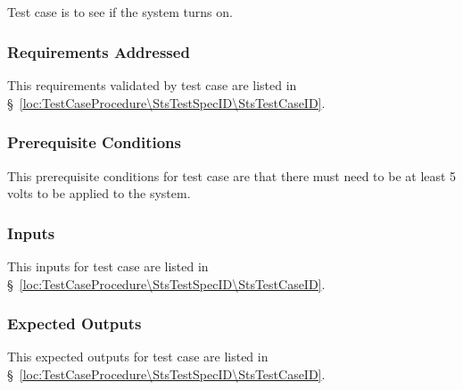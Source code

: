 
\subsection{\StsTestCaseID}
\label{loc:Test\StsTestCaseID}


Test \StsTestSpecID{} case \StsTestCaseID{} is to see if the system turns on.

\subsubsection{Requirements Addressed}
\label{loc:TestCaseRequirementsAddressed\StsTestSpecID\StsTestCaseID}


This requirements validated by test \StsTestSpecID{} case \StsTestCaseID{} are listed in \S~\ref{loc:TestCaseProcedure\StsTestSpecID\StsTestCaseID}.

\subsubsection{Prerequisite Conditions}
\label{loc:TestCasePrerequisiteConditions\StsTestSpecID\StsTestCaseID}


This prerequisite conditions for test \StsTestSpecID{} case \StsTestCaseID{} are that there must need to be at least 5 volts to be applied to the system.

\subsubsection{Inputs}
\label{loc:TestCaseInputs\StsTestSpecID\StsTestCaseID}


This inputs for test \StsTestSpecID{} case \StsTestCaseID{} are listed in \S~\ref{loc:TestCaseProcedure\StsTestSpecID\StsTestCaseID}.

\subsubsection{Expected Outputs}
\label{loc:TestCaseExpectedOutputs\StsTestSpecID\StsTestCaseID}


This expected outputs for test \StsTestSpecID{} case \StsTestCaseID{} are listed in \S~\ref{loc:TestCaseProcedure\StsTestSpecID\StsTestCaseID}.

